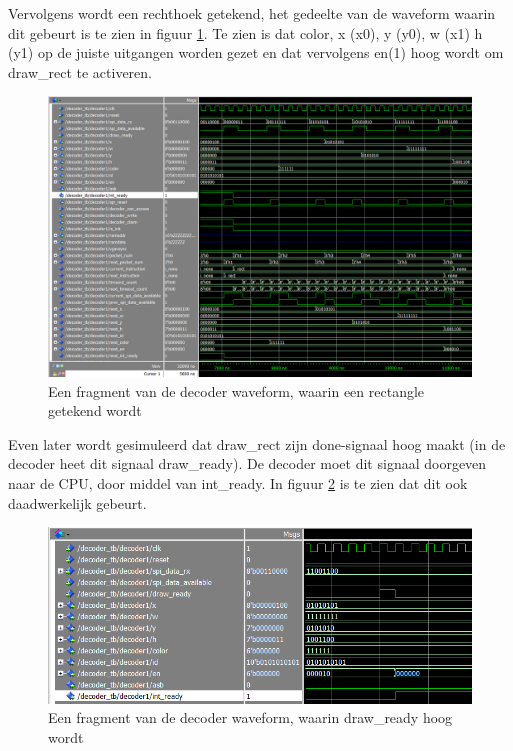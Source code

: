 \documentclass{scrartcl} %
\begin{document}
Vervolgens wordt een rechthoek getekend, het gedeelte van de waveform waarin dit gebeurt is te zien in figuur \ref{fig:decoder-modelsim-rect}. Te zien is dat color, x (x0), y (y0), w (x1) h (y1) op de juiste uitgangen worden gezet en dat vervolgens en(1) hoog wordt om draw\_rect te activeren.

\begin{figure}[H]
	\centering
	\includegraphics[width=\textwidth]{resource/decoder-modelsim-rect.png}
	\caption{Een fragment van de decoder waveform, waarin een rectangle getekend wordt}
	\label{fig:decoder-modelsim-rect}
\end{figure}

Even later wordt gesimuleerd dat draw\_rect zijn done-signaal hoog maakt (in de decoder heet dit signaal draw\_ready). De decoder moet dit signaal doorgeven naar de CPU, door middel van int\_ready. In figuur \ref{fig:decoder-modelsim-draw-ready} is te zien dat dit ook daadwerkelijk gebeurt.

\begin{figure}[H]
	\centering
	\includegraphics[width=\textwidth]{resource/decoder-modelsim-draw-ready.png}
	\caption{Een fragment van de decoder waveform, waarin draw\_ready hoog wordt}
	\label{fig:decoder-modelsim-draw-ready}
\end{figure}
\end{document}
